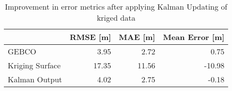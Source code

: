 \begin{table}
\centering
\caption{Improvement in error metrics after applying Kalman Updating of kriged data}
\label{tab:oahu4_gebco_raster_error}
\begin{tabular}{lrrr}
\toprule
 & RMSE [m] & MAE [m] & Mean Error [m] \\
\midrule
GEBCO & 3.95 & 2.72 & 0.75 \\
Kriging Surface & 17.35 & 11.56 & -10.98 \\
Kalman Output & 4.02 & 2.75 & -0.18 \\
\bottomrule
\end{tabular}
\end{table}
